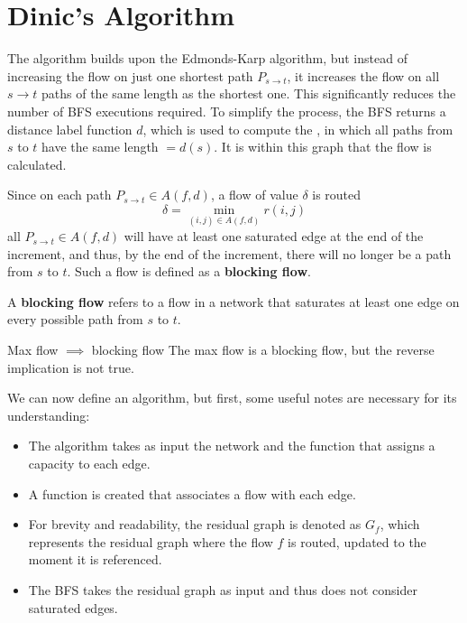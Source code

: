 
\chapter{Dinic's Algorithm} \label{chap:dnc}

The algorithm builds upon the Edmonds-Karp algorithm, but instead of increasing the flow on just one shortest path $P_{s\rightarrow t}$, it increases the flow on all $s\rightarrow t$ paths of the same length as the shortest one.
This significantly reduces the number of BFS executions required.
To simplify the process, the BFS returns a distance label function $d$, which is used to compute the , in which all paths from $s$ to $t$ have the same length $=d(s)$. It is within this graph that the flow is calculated.

Since on each path $P_{s\rightarrow t} \in A(f,d)$, a flow of value $\delta$ is routed
\[\delta = \min_{(i,j)\in A(f,d)} r(i,j)\]
all $P_{s\rightarrow t} \in A(f,d)$ will have at least one saturated edge at the end of the increment, and thus, by the end of the increment, there will no longer be a path from $s$ to $t$.
Such a flow is defined as a \textbf{blocking flow}.
\begin{definition}
    A \textbf{blocking flow} refers to a flow in a network that saturates at least one edge on every possible path from $s$ to $t$.  
\end{definition}

\begin{obs}{Max flow $\implies$ blocking flow}{}
    The max flow is a blocking flow, but the reverse implication is not true.
\end{obs}

We can now define an algorithm, but first, some useful notes are necessary for its understanding:
\begin{itemize}
    \item The algorithm takes as input the network and the function that assigns a capacity to each edge.
    \item A function is created that associates a flow with each edge.
    \item For brevity and readability, the residual graph is denoted as \( G_f \), which represents the residual graph where the flow \( f \) is routed, updated to the moment it is referenced.
    \item The BFS takes the residual graph as input and thus does not consider saturated edges.
\end{itemize}


